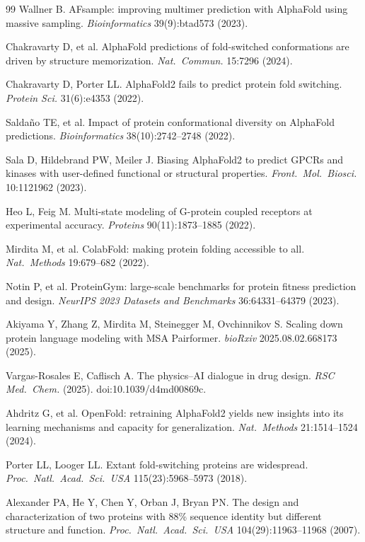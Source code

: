 \documentclass[11pt]{article}
\begin{document}
\begin{thebibliography}{99}
Wallner B. AFsample: improving multimer prediction with AlphaFold using
massive sampling. \emph{Bioinformatics} 39(9):btad573 (2023).

Chakravarty D, et al. AlphaFold predictions of fold-switched conformations
are driven by structure memorization. \emph{Nat.\ Commun.} 15:7296 (2024).

Chakravarty D, Porter LL. AlphaFold2 fails to predict protein fold
switching. \emph{Protein Sci.} 31(6):e4353 (2022).

Salda\~no TE, et al. Impact of protein conformational diversity on
AlphaFold predictions. \emph{Bioinformatics} 38(10):2742--2748 (2022).

Sala D, Hildebrand PW, Meiler J. Biasing AlphaFold2 to predict GPCRs and
kinases with user-defined functional or structural properties.
\emph{Front.\ Mol.\ Biosci.} 10:1121962 (2023).

Heo L, Feig M. Multi-state modeling of G-protein coupled receptors at
experimental accuracy. \emph{Proteins} 90(11):1873--1885 (2022).

Mirdita M, et al. ColabFold: making protein folding accessible to all.
\emph{Nat.\ Methods} 19:679--682 (2022).

Notin P, et al. ProteinGym: large-scale benchmarks for protein fitness
prediction and design. \emph{NeurIPS 2023 Datasets and Benchmarks}
36:64331--64379 (2023).

Akiyama Y, Zhang Z, Mirdita M, Steinegger M, Ovchinnikov S. Scaling down
protein language modeling with MSA Pairformer. \emph{bioRxiv}
2025.08.02.668173 (2025).

Vargas-Rosales E, Caflisch A. The physics--AI dialogue in drug design.
\emph{RSC Med.\ Chem.} (2025). doi:10.1039/d4md00869c.

Ahdritz G, et al. OpenFold: retraining AlphaFold2 yields new insights into
its learning mechanisms and capacity for generalization. \emph{Nat.\
Methods} 21:1514--1524 (2024).

Porter LL, Looger LL. Extant fold-switching proteins are widespread.
\emph{Proc.\ Natl.\ Acad.\ Sci.\ USA} 115(23):5968--5973 (2018).

Alexander PA, He Y, Chen Y, Orban J, Bryan PN. The design and
characterization of two proteins with 88\% sequence identity but different
structure and function. \emph{Proc.\ Natl.\ Acad.\ Sci.\ USA}
104(29):11963--11968 (2007).


\end{thebibliography}
\end{document}
